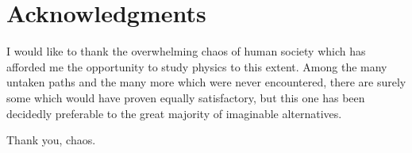 \chapter*{Acknowledgments}

I would like to thank the overwhelming chaos of human society which has afforded
me the opportunity to study physics to this extent. Among the many untaken 
paths and the many more which were never encountered, there are surely some
which would have proven equally satisfactory, but this one has been decidedly
preferable to the great majority of imaginable alternatives.

Thank you, chaos.
